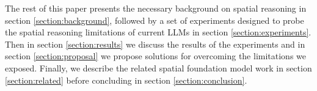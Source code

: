 The rest of this paper presents the necessary background on spatial reasoning in section \ref{section:background}, followed by a set of experiments designed to probe the spatial reasoning limitations of current LLMs in section \ref{section:experiments}.
Then in section \ref{section:results} we discuss the results of the experiments and in section \ref{section:proposal} we propose solutions for overcoming the limitations we exposed.
Finally, we describe the related spatial foundation model work in section \ref{section:related} before concluding in section \ref{section:conclusion}. 





